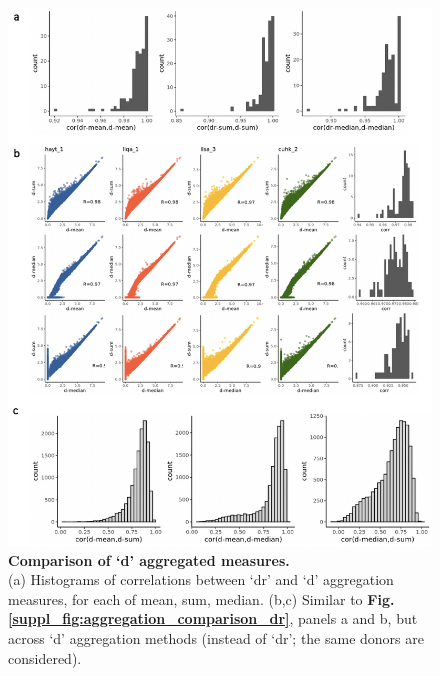 \begin{figure}[h]
    \centering
    \includegraphics[width=15cm]{Appendix2/Fig/supp_aggregated_figures_d.png}
    \caption[Comparison of `d' aggregated measures]{\textbf{Comparison of `d' aggregated measures.}\\
    (a) Histograms of correlations between `dr' and `d' aggregation measures, for each of mean, sum, median.
    (b,c) Similar to \textbf{Fig. \ref{suppl_fig:aggregation_comparison_dr}}, panels a and b, but across `d' aggregation methods (instead of `dr'; the same donors are considered).}
    \label{suppl_fig:aggregation_comparison_d}
\end{figure}

